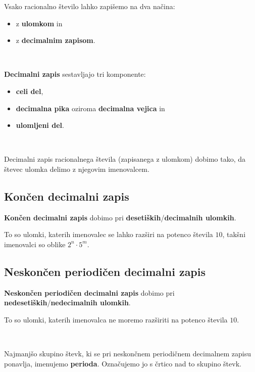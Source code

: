         Vsako racionalno število lahko zapišemo na dva načina:
        \begin{itemize}
            \item z \textbf{ulomkom} in 
            \item z \textbf{decimalnim zapisom}.
        \end{itemize}

        ~

        \textbf{Decimalni zapis} sestavljajo tri komponente:
        \begin{itemize}
            \item \textbf{celi del},
            \item \textbf{decimalna pika} oziroma \textbf{decimalna vejica} in 
            \item \textbf{ulomljeni del}.
        \end{itemize}

        ~

        Decimalni zapis racionalnega števila (zapisanega z ulomkom) dobimo tako, 
        da števec ulomka delimo z njegovim imenovalcem.



        \subsection*{Končen decimalni zapis}
        
        \textbf{Končen decimalni zapis} dobimo pri \textbf{desetiških}/\textbf{decimalnih ulomkih}. 
        
        To so ulomki, katerih imenovalec se lahko razširi na potenco števila $10$, takšni imenovalci so oblike $2^n\cdot 5^m$.

        

        \subsection*{Neskončen periodičen decimalni zapis}
        
        \textbf{Neskončen periodičen decimalni zapis} dobimo pri \textbf{nedesetiških}/\textbf{nedecimalnih ulomkih}. 
        
        To so ulomki, katerih imenovalca ne moremo razširiti na potenco števila $10$.

        ~

        Najmanjšo skupino števk, ki se pri neskončnem periodičnem decimalnem zapisu ponavlja, imenujemo \textbf{perioda}.
        Označujemo jo s črtico nad to skupino števk.

